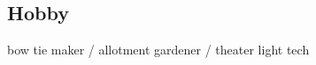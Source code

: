 \documentclass[margin]{res}
\begin{document}
\begin{sloppypar}
\begin{resume}
\section{Hobby}
bow tie maker / allotment gardener / theater light tech



\end{resume} 
\end{sloppypar}
\end{document}
